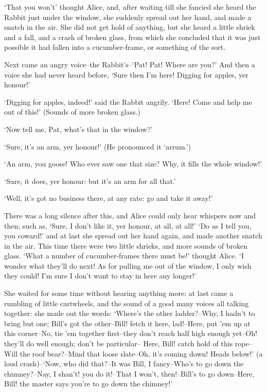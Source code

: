 \documentclass[statementpaper,twoside,openany]{memoir}
\begin{document}
`That you won't' thought Alice, and, after waiting till she fancied she heard the Rabbit just under the window, she suddenly spread out her hand, and made a snatch in the air. She did not get hold of anything, but she heard a little shriek and a fall, and a crash of broken glass, from which she concluded that it was just possible it had fallen into a cucumber-frame, or something of the sort.

Next came an angry voice--the Rabbit's--`Pat! Pat! Where are you?' And then a voice she had never heard before, `Sure then I'm here! Digging for apples, yer honour!'

`Digging for apples, indeed!' said the Rabbit angrily. `Here! Come and help me out of this!' (Sounds of more broken glass.)

`Now tell me, Pat, what's that in the window?'

`Sure, it's an arm, yer honour!' (He pronounced it `arrum.')

`An arm, you goose! Who ever saw one that size? Why, it fills the whole window!'

`Sure, it does, yer honour: but it's an arm for all that.'

`Well, it's got no business there, at any rate: go and take it away!'

There was a long silence after this, and Alice could only hear whispers now and then; such as, `Sure, I don't like it, yer honour, at all, at all!' `Do as I tell you, you coward!' and at last she spread out her hand again, and made another snatch in the air. This time there were two little shrieks, and more sounds of broken glass. `What a number of cucumber-frames there must be!' thought Alice. `I wonder what they'll do next! As for pulling me out of the window, I only wish they could! I'm sure I don't want to stay in here any longer!'

She waited for some time without hearing anything more: at last came a rumbling of little cartwheels, and the sound of a good many voices all talking together: she made out the words: `Where's the other ladder?--Why, I hadn't to bring but one; Bill's got the other--Bill! fetch it here, lad!--Here, put 'em up at this corner--No, tie 'em together first--they don't reach half high enough yet--Oh! they'll do well enough; don't be particular-- Here, Bill! catch hold of this rope--Will the roof bear?--Mind that loose slate--Oh, it's coming down! Heads below!' (a loud crash)--`Now, who did that?--It was Bill, I fancy--Who's to go down the chimney?--Nay, I shan't! you do it!--That I won't, then!--Bill's to go down--Here, Bill! the master says you're to go down the chimney!'
\end{document}
